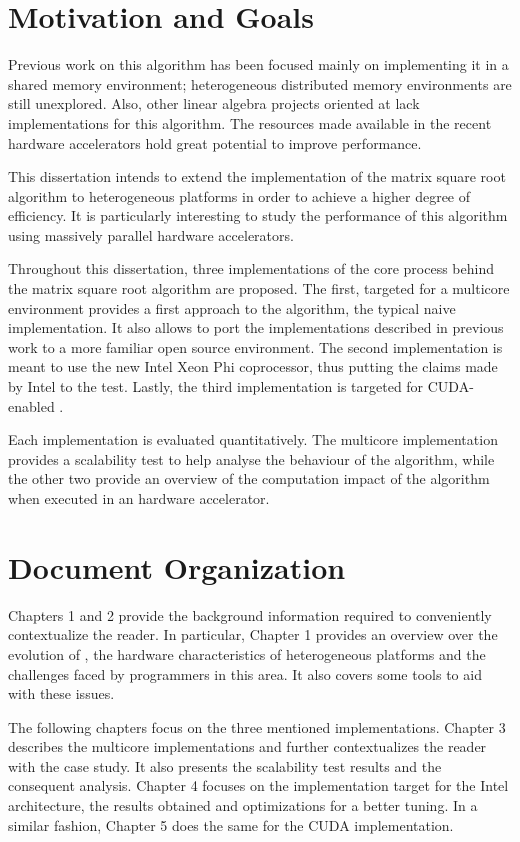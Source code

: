 \documentclass[../thesis]{subfiles}
\begin{document}

	\section{Motivation and Goals}
	Previous work on this algorithm has been focused mainly on implementing it in a \cpu shared memory environment; heterogeneous distributed memory environments are still unexplored. Also, other linear algebra projects oriented at \gpus lack implementations for this algorithm. The resources made available in the recent hardware accelerators hold great potential to improve performance.

	This dissertation intends to extend the implementation of the matrix square root algorithm to heterogeneous platforms in order to achieve a higher degree of efficiency. It is particularly interesting to study the performance of this algorithm using massively parallel hardware accelerators.

	Throughout this dissertation, three implementations of the core process behind the matrix square root algorithm are proposed. The first, targeted for a multicore environment provides a first approach to the algorithm, the typical naive implementation. It also allows to port the implementations described in previous work to a more familiar open source environment. The second implementation is meant to use the new Intel Xeon Phi coprocessor, thus putting the claims made by Intel to the test. Lastly, the third implementation is targeted for CUDA-enabled \gpus.

	Each implementation is evaluated quantitatively. The multicore implementation provides a scalability test to help analyse the behaviour of the algorithm, while the other two provide an overview of the computation impact of the algorithm when executed in an hardware accelerator.

	\section{Document Organization}
	Chapters 1 and 2 provide the background information required to conveniently contextualize the reader. In particular, Chapter 1 provides an overview over the evolution of \hpc, the hardware characteristics of heterogeneous platforms and the challenges faced by programmers in this area. It also covers some tools to aid with these issues.

	The following chapters focus on the three mentioned implementations. Chapter 3 describes the multicore implementations and further contextualizes the reader with the case study. It also presents the scalability test results and the consequent analysis. Chapter 4 focuses on the implementation target for the Intel \mic architecture, the results obtained and optimizations for a better tuning. In a similar fashion, Chapter 5 does the same for the CUDA implementation.
\end{document}

